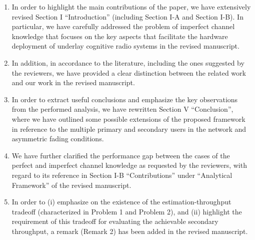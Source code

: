 \documentclass[12pt,a4wide,peerreview]{IEEEtran}
\begin{document}
\begin{enumerate}
  \item In order to highlight the main contributions of the paper, we have extensively revised Section I ``Introduction'' (including Section I-A and Section I-B). In particular, we have carefully addressed the problem of imperfect channel knowledge that focuses on the key aspects that facilitate the hardware deployment of underlay cognitive radio systems in the revised manuscript. 
\item In addition, in accordance to the literature, including the ones suggested by the reviewers, we have provided a clear distinction between the related work and our work in the revised manuscript. 
  \item In order to extract useful conclusions and emphasize the key observations from the performed analysis, we have rewritten Section V ``Conclusion'', where we have outlined some possible extensions of the proposed framework in reference to the multiple primary and secondary users in the network and asymmetric fading conditions. 
  \item %
We have further clarified the performance gap between the cases of the perfect and imperfect channel knowledge as requested by the reviewers, with regard to its reference in Section I-B ``Contributions'' under ``Analytical Framework'' of the revised manuscript.
 \item In order to (i) emphasize on the existence of the estimation-throughput tradeoff (characterized in Problem 1 and Problem 2), and (ii) highlight the requirement of this tradeoff for evaluating the achievable secondary throughput, a remark (Remark 2) has been added in the revised manuscript. 

\end{enumerate}
\end{document}
